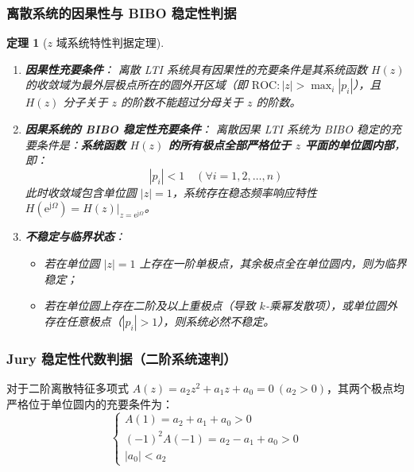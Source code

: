 \documentclass[11pt,a4paper,fontset=fandol]{ctexart}
\newtheorem{theorem}{定理}[section]
\theoremstyle{remark}
\begin{document}
\subsubsection{离散系统的因果性与 BIBO 稳定性判据}
\begin{theorem}[$z$ 域系统特性判据定理]
\begin{enumerate}
    \item \textbf{因果性充要条件}：
    离散 LTI 系统具有因果性的充要条件是其系统函数 $H(z)$ 的收敛域为最外层极点所在的圆外开区域（即 $\mathrm{ROC}: |z| > \max_i |p_i|$），且 $H(z)$ 分子关于 $z$ 的阶数不能超过分母关于 $z$ 的阶数。
    \item \textbf{因果系统的 BIBO 稳定性充要条件}：
    离散因果 LTI 系统为 BIBO 稳定的充要条件是：\textbf{系统函数 $H(z)$ 的所有极点全部严格位于 $z$ 平面的单位圆内部}，即：
    \begin{equation}
        |p_i| < 1 \quad (\forall i = 1, 2, \dots, n)
    \end{equation}
    此时收敛域包含单位圆 $|z| = 1$，系统存在稳态频率响应特性 $H(\mathrm{e}^{\mathrm{j}\Omega}) = \left. H(z) \right|_{z = \mathrm{e}^{\mathrm{j}\Omega}}$。
    \item \textbf{不稳定与临界状态}：
    \begin{itemize}
        \item 若在单位圆 $|z| = 1$ 上存在一阶单极点，其余极点全在单位圆内，则为临界稳定；
        \item 若在单位圆上存在二阶及以上重极点（导致 $k$-乘幂发散项），或单位圆外存在任意极点（$|p_i| > 1$），则系统必然不稳定。
    \end{itemize}
\end{enumerate}
\end{theorem}

\subsubsection{Jury 稳定性代数判据（二阶系统速判）}
对于二阶离散特征多项式 $A(z) = a_2 z^2 + a_1 z + a_0 = 0 \ (a_2 > 0)$，其两个极点均严格位于单位圆内的充要条件为：
\begin{equation}
    \begin{cases}
        A(1) = a_2 + a_1 + a_0 > 0 \\
        (-1)^2 A(-1) = a_2 - a_1 + a_0 > 0 \\
        |a_0| < a_2
    \end{cases}
\end{equation}
\end{document}
